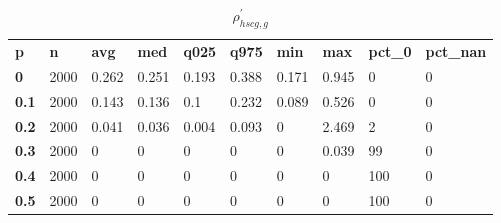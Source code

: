 \begin{table}[h]
 \centering 
\footnotesize
\caption{$\rho_{hscg,g}^\prime $}
\label{tab:alphahscgg}
\begin{tabular}[h]{| l l l l l l l l l l|
    } \hline
\textbf{ p} & \textbf{ n} & \textbf{ avg} & \textbf{ med} & \textbf{ q025} & \textbf{ q975} & \textbf{ min} & \textbf{ max} & \textbf{ pct\_0} & \textbf{ pct\_nan}
           \\
  \textbf{  0} & 2000 & 0.262 & 0.251 & 0.193 & 0.388 & 0.171 & 0.945 &   0 & 0
           \\
  \textbf{0.1} & 2000 & 0.143 & 0.136 &   0.1 & 0.232 & 0.089 & 0.526 &   0 & 0
           \\
  \textbf{0.2} & 2000 & 0.041 & 0.036 & 0.004 & 0.093 &     0 & 2.469 &   2 & 0
           \\
  \textbf{0.3} & 2000 &     0 &     0 &     0 &     0 &     0 & 0.039 &  99 & 0
           \\
  \textbf{0.4} & 2000 &     0 &     0 &     0 &     0 &     0 &     0 & 100 & 0
           \\
  \textbf{0.5} & 2000 &     0 &     0 &     0 &     0 &     0 &     0 & 100 & 0
           \\
 \hline \end{tabular}
 \end{table}
